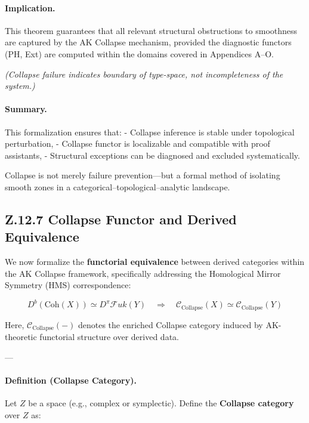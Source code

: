 \documentclass[11pt]{article}
\begin{document}
\begin{axiom}
\begin{axiom}
{{\paragraph{Implication.}

This theorem guarantees that all relevant structural obstructions to smoothness are captured by the AK Collapse mechanism,  
provided the diagnostic functors (PH, Ext) are computed within the domains covered in Appendices A–O.

\vspace{1em}
\textit{(Collapse failure indicates boundary of type-space, not incompleteness of the system.)}



\paragraph{Summary.}

This formalization ensures that:
- Collapse inference is stable under topological perturbation,
- Collapse functor is localizable and compatible with proof assistants,
- Structural exceptions can be diagnosed and excluded systematically.

Collapse is not merely failure prevention—but a formal method of isolating smooth zones in a categorical–topological–analytic landscape.


\subsection*{Z.12.7 Collapse Functor and Derived Equivalence}

We now formalize the \textbf{functorial equivalence} between derived categories within the AK Collapse framework,  
specifically addressing the Homological Mirror Symmetry (HMS) correspondence:

\[
D^b(\mathrm{Coh}(X)) \simeq D^\pi \mathcal{F}uk(Y)
\quad \Longrightarrow \quad
\mathcal{C}_{\text{Collapse}}(X) \simeq \mathcal{C}_{\text{Collapse}}(Y)
\]

Here, \( \mathcal{C}_{\text{Collapse}}(-) \) denotes the enriched Collapse category induced by AK-theoretic functorial structure over derived data.

---

\paragraph{Definition (Collapse Category).}
Let \( Z \) be a space (e.g., complex or symplectic).  
Define the \textbf{Collapse category} over \( Z \) as:

}}
\end{axiom}
\end{axiom}
\end{document}
